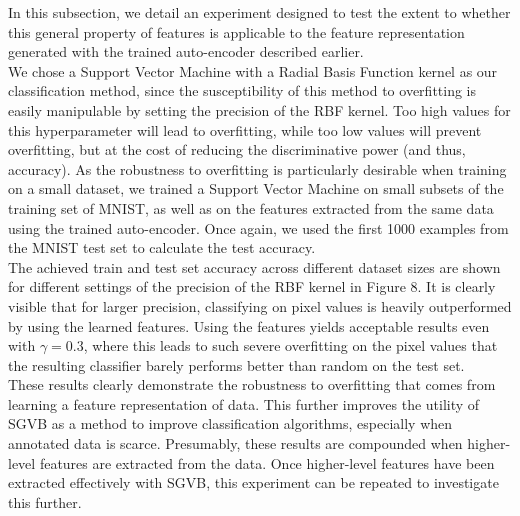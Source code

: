 \documentclass{article}
\begin{document}
In this subsection, we detail an experiment designed to test the extent to whether this general property of features is applicable to the feature representation generated with the trained auto-encoder described earlier.\\
We chose a Support Vector Machine with a Radial Basis Function kernel as our classification method, since the susceptibility of this method to overfitting is easily manipulable by setting the precision of the RBF kernel. Too high values for this hyperparameter will lead to overfitting, while too low values will prevent overfitting, but at the cost of reducing the discriminative power (and thus, accuracy). As the robustness to overfitting is particularly desirable when training on a small dataset, we trained a Support Vector Machine on small subsets of the training set of MNIST, as well as on the features extracted from the same data using the trained auto-encoder. Once again, we used the first 1000 examples from the MNIST test set to calculate the test accuracy.\\
The achieved train and test set accuracy across different dataset sizes are shown for different settings of the precision of the RBF kernel in Figure 8. It is clearly visible that for larger precision, classifying on pixel values is heavily outperformed by using the learned features. Using the features yields acceptable results even with $\gamma = 0.3$, where this leads to such severe overfitting on the pixel values that the resulting classifier barely performs better than random on the test set.\\
These results clearly demonstrate the robustness to overfitting that comes from learning a feature representation of data. This further improves the utility of SGVB as a method to improve classification algorithms, especially when annotated data is scarce. Presumably, these results are compounded when higher-level features are extracted from the data. Once higher-level features have been extracted effectively with SGVB, this experiment can be repeated to investigate this further.
\end{document}
